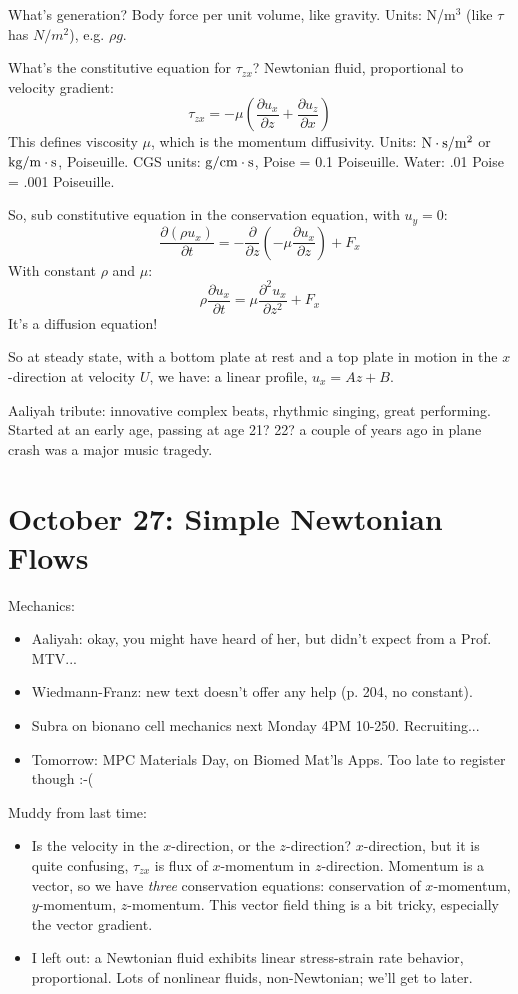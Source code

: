 \documentclass{report}
\begin{document}
What's generation?  Body force per unit volume, like gravity.  Units: N/m$^3$
(like $\tau$ has $N/m^2$), e.g. $\rho g$.

What's the constitutive equation for $\tau_{zx}$?  Newtonian fluid,
proportional to velocity gradient:
$$\tau_{zx} = -\mu \left(\frac{\partial u_x}{\partial z} +
  \frac{\partial u_z}{\partial x}\right)$$
This defines viscosity $\mu$, which is the momentum diffusivity.  Units: $\rm
N\cdot s/m^2$ or $\rm kg/m\cdot s$, Poiseuille.  CGS units: $\rm g/cm\cdot s$,
Poise = 0.1 Poiseuille.  Water: .01 Poise = .001 Poiseuille.

So, sub constitutive equation in the conservation equation, with $u_y=0$:
$$\frac{\partial(\rho u_x)}{\partial t} =
-\frac{\partial}{\partial z}\left(-\mu\frac{\partial u_x}{\partial z}\right)
 + F_x$$
With constant $\rho$ and $\mu$:
$$\rho\frac{\partial u_x}{\partial t} = \mu\frac{\partial^2 u_x}{\partial z^2}
+ F_x$$
It's a diffusion equation!

So at steady state, with a bottom plate at rest and a top plate in motion in
the $x$-direction at velocity $U$, we have: a linear profile, $u_x=Az+B$.  

Aaliyah tribute: innovative complex beats, rhythmic singing, great performing.
Started at an early age, passing at age 21? 22? a couple of years ago in plane
crash was a major music tragedy.
\newpage


\section{October 27: Simple Newtonian Flows}

Mechanics:
\begin{itemize}
\item Aaliyah: okay, you might have heard of her, but didn't expect from a
  Prof.  MTV...
\item Wiedmann-Franz: new text doesn't offer any help (p. 204, no constant).
\item Subra on bionano cell mechanics next Monday 4PM 10-250.  Recruiting...
\item Tomorrow: MPC Materials Day, on Biomed Mat'ls Apps.  Too late to register
  though :-(
\end{itemize}

\noindent Muddy from last time:
\begin{itemize}
\item Is the velocity in the $x$-direction, or the $z$-direction?
  $x$-direction, but it is quite confusing, $\tau_{zx}$ is flux of $x$-momentum
  in $z$-direction.  Momentum is a vector, so we have {\em three} conservation
  equations: conservation of $x$-momentum, $y$-momentum, $z$-momentum.  This
  vector field thing is a bit tricky, especially the vector gradient.
\item I left out: a Newtonian fluid exhibits linear stress-strain rate
  behavior, proportional.  Lots of nonlinear fluids, non-Newtonian; we'll get
  to later.
\end{itemize}
\end{document}
